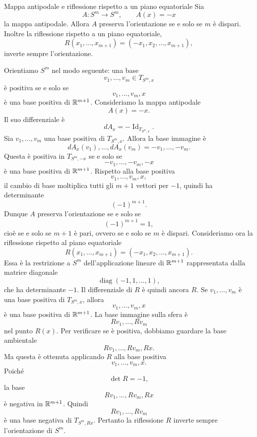 \documentclass[a4paper]{article}
\begin{document}
\begin{snippetproposition}{Mappa antipodale e riflessione rispetto a un piano equatoriale}
    Sia
    \[
        A\colon S^m\longrightarrow S^m,
        \qquad
        A(x)=-x
    \]
    la mappa antipodale. Allora \(A\) preserva l'orientazione se e solo se
    \(m\) è dispari. Inoltre la riflessione rispetto a un piano equatoriale,
    \[
        R(x_1,\ldots,x_{m+1})=(-x_1,x_2,\ldots,x_{m+1}),
    \]
    inverte sempre l'orientazione.
\end{snippetproposition}

\begin{snippetproof}{}
    Orientiamo \(S^m\) nel modo seguente: una base
    \[
        v_1,\ldots,v_m\in T_{S^m,x}
    \]
    è positiva se e solo se
    \[
        v_1,\ldots,v_m,x
    \]
    è una base positiva di \(\mathbb{R}^{m+1}\).
    Consideriamo la mappa antipodale
    \[
        A(x)=-x.
    \]
    Il suo differenziale è
    \[
        dA_x=-\operatorname{Id}_{T_{S^m,x}}.
    \]
    Sia \(v_1,\ldots,v_m\) una base positiva di \(T_{S^m,x}\). Allora la base immagine è
    \[
        dA_x(v_1),\ldots,dA_x(v_m)
        =
        -v_1,\ldots,-v_m.
    \]
    Questa è positiva in \(T_{S^m,-x}\) se e solo se
    \[
        -v_1,\ldots,-v_m,-x
    \]
    è una base positiva di \(\mathbb{R}^{m+1}\). Rispetto alla base positiva
    \[
        v_1,\ldots,v_m,x,
    \]
    il cambio di base moltiplica tutti gli \(m+1\) vettori per \(-1\), quindi ha determinante
    \[
        (-1)^{m+1}.
    \]
    Dunque \(A\) preserva l'orientazione se e solo se
    \[
        (-1)^{m+1}=1,
    \]
    cioè se e solo se \(m+1\) è pari, ovvero se e solo se \(m\) è dispari.
    Consideriamo ora la riflessione rispetto al piano equatoriale
    \[
        R(x_1,\ldots,x_{m+1})
        =
        (-x_1,x_2,\ldots,x_{m+1}).
    \]
    Essa è la restrizione a \(S^m\) dell'applicazione lineare di \(\mathbb{R}^{m+1}\) rappresentata dalla matrice diagonale
    \[
        \operatorname{diag}(-1,1,\ldots,1),
    \]
    che ha determinante \(-1\). Il differenziale di \(R\) è quindi ancora \(R\). Se \(v_1,\ldots,v_m\) è una base positiva di \(T_{S^m,x}\), allora
    \[
        v_1,\ldots,v_m,x
    \]
    è una base positiva di \(\mathbb{R}^{m+1}\). La base immagine sulla sfera è
    \[
        Rv_1,\ldots,Rv_m
    \]
    nel punto \(R(x)\). Per verificare se è positiva, dobbiamo guardare la base ambientale
    \[
        Rv_1,\ldots,Rv_m,Rx.
    \]
    Ma questa è ottenuta applicando \(R\) alla base positiva
    \[
        v_1,\ldots,v_m,x.
    \]
    Poiché
    \[
        \det R=-1,
    \]
    la base
    \[
        Rv_1,\ldots,Rv_m,Rx
    \]
    è negativa in \(\mathbb{R}^{m+1}\). Quindi
    \[
        Rv_1,\ldots,Rv_m
    \]
    è una base negativa di \(T_{S^m,Rx}\). Pertanto la riflessione \(R\) inverte sempre l'orientazione di \(S^m\).
\end{snippetproof}
\end{document}
